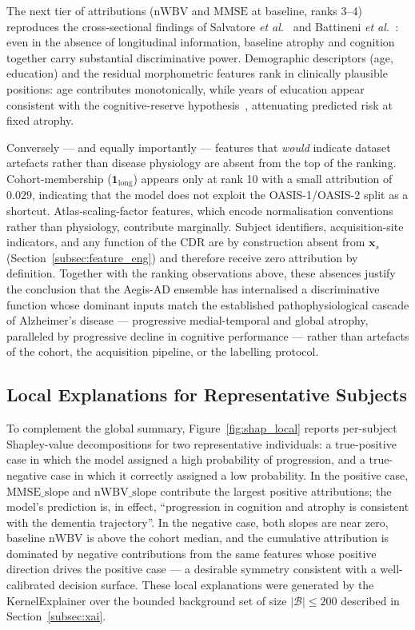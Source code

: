 The next tier of attributions ($\mathrm{nWBV}$ and $\mathrm{MMSE}$ at baseline, ranks 3--4) reproduces the cross-sectional findings of Salvatore \emph{et al.}~\cite{salvatore2015} and Battineni \emph{et al.}~\cite{battineni2020}: even in the absence of longitudinal information, baseline atrophy and cognition together carry substantial discriminative power. Demographic descriptors (age, education) and the residual morphometric features rank in clinically plausible positions: age contributes monotonically, while years of education appear consistent with the cognitive-reserve hypothesis~\cite{frisoni2010}, attenuating predicted risk at fixed atrophy.

Conversely --- and equally importantly --- features that \emph{would} indicate dataset artefacts rather than disease physiology are absent from the top of the ranking. Cohort-membership ($\mathbf{1}_{\mathrm{long}}$) appears only at rank 10 with a small attribution of $0.029$, indicating that the model does not exploit the OASIS-1/OASIS-2 split as a shortcut. Atlas-scaling-factor features, which encode normalisation conventions rather than physiology, contribute marginally. Subject identifiers, acquisition-site indicators, and any function of the CDR are by construction absent from $\mathbf{x}_s$ (Section~\ref{subsec:feature_eng}) and therefore receive zero attribution by definition. Together with the ranking observations above, these absences justify the conclusion that the Aegis-AD ensemble has internalised a discriminative function whose dominant inputs match the established pathophysiological cascade of Alzheimer's disease --- progressive medial-temporal and global atrophy, paralleled by progressive decline in cognitive performance --- rather than artefacts of the cohort, the acquisition pipeline, or the labelling protocol.

\subsection{Local Explanations for Representative Subjects}
\label{subsec:res_local_shap}

To complement the global summary, Figure~\ref{fig:shap_local} reports per-subject Shapley-value decompositions for two representative individuals: a true-positive case in which the model assigned a high probability of progression, and a true-negative case in which it correctly assigned a low probability. In the positive case, $\mathrm{MMSE\_slope}$ and $\mathrm{nWBV\_slope}$ contribute the largest positive attributions; the model's prediction is, in effect, ``progression in cognition and atrophy is consistent with the dementia trajectory''. In the negative case, both slopes are near zero, baseline $\mathrm{nWBV}$ is above the cohort median, and the cumulative attribution is dominated by negative contributions from the same features whose positive direction drives the positive case --- a desirable symmetry consistent with a well-calibrated decision surface. These local explanations were generated by the KernelExplainer over the bounded background set of size $|\mathcal{B}| \le 200$ described in Section~\ref{subsec:xai}.

